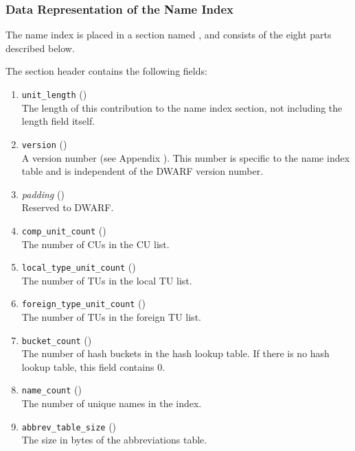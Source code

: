 \subsubsection{Data Representation of the Name Index}
\label{chap:datarepresentationofthenameindex}
The name index is placed in a section named \dotdebugnames, and
consists of the eight parts described below.

The section header contains the following fields:
\begin{enumerate}[1. ]
\item \texttt{unit\_length} () \\
The length of this contribution to the name index section,
not including the length field itself.

\item \texttt{version} (\HFTuhalf) \\
A version number 
(see Appendix ). 
This number is specific to the name index table and is
independent of the DWARF version number.

\item \textit{padding} (\HFTuhalf) \\
Reserved to DWARF.

\item \texttt{comp\_unit\_count} (\HFTuword) \\
The number of CUs in the CU list.

\item \texttt{local\_type\_unit\_count} (\HFTuword) \\
The number of TUs in the local TU list.

\item \texttt{foreign\_type\_unit\_count} (\HFTuword) \\
The number of TUs in the foreign TU list.

\item \texttt{bucket\_count} (\HFTuword) \\
The number of hash buckets in the hash lookup table. 
If there is no hash lookup table, this field contains 0.

\item \texttt{name\_count} (\HFTuword) \\
The number of unique names in the index.

\item \texttt{abbrev\_table\_size} (\HFTuword) \\
The size in bytes of the abbreviations table.


\end{enumerate}
